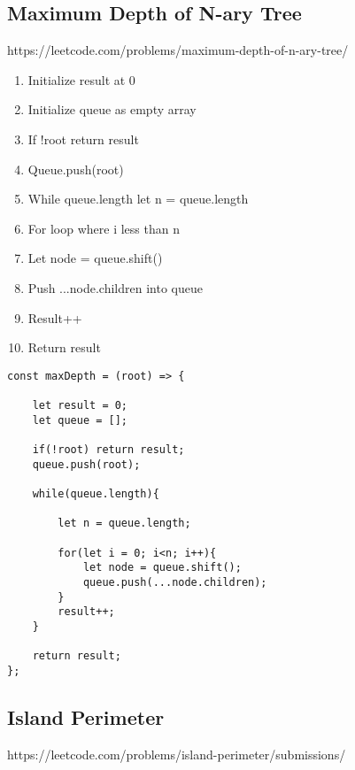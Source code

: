 \documentclass[10pt]{article}
\begin{document}
\pagebreak
\medskip   
\subsection {Maximum Depth of N-ary Tree}
https://leetcode.com/problems/maximum-depth-of-n-ary-tree/

\begin{enumerate}
	\item Initialize result at 0
	\item Initialize queue as empty array
	\item If !root return result
	\item Queue.push(root)
	\item While queue.length let n = queue.length
	\item For loop where i less than n 
	\item Let node = queue.shift()
	\item Push ...node.children into queue
	\item Result++ 
	\item Return result
\end{enumerate}

\begin{lstlisting}[title=Solution maxDepth, captionpos=t]
const maxDepth = (root) => {
    
    let result = 0;
    let queue = [];
    
    if(!root) return result;
    queue.push(root);
    
    while(queue.length){
        
        let n = queue.length;
        
        for(let i = 0; i<n; i++){
            let node = queue.shift();
            queue.push(...node.children);
        }
        result++;
    }
    
    return result;
};
\end{lstlisting}

\medskip %













\pagebreak
\medskip   
\subsection {Island Perimeter}
https://leetcode.com/problems/island-perimeter/submissions/
\end{document}
